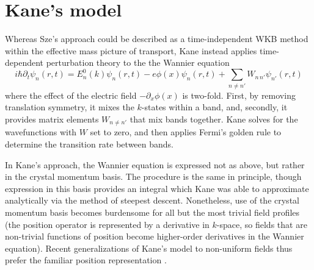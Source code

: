 \section{Kane's model}
Whereas Sze's approach could be described as a time-independent WKB method within the effective mass picture of transport, Kane instead applies time-dependent perturbation theory to the the Wannier equation
$$i\hbar\partial_t\psi_n(r,t)=E_n^0(k)\psi_n(r,t)-e\phi(x)\psi_n(r,t)+\sum_{n\neq n'} W_{n\,n'}\psi_{n'}(r,t)$$
where the effect of the electric field $-\partial_x\phi(x)$ is two-fold.  First, by removing translation symmetry, it mixes the $k$-states within a band, and, secondly, it provides matrix elements $W_{n\neq n'}$ that mix bands together.  Kane solves for the wavefunctions with $W$ set to zero, and then applies Fermi's golden rule to determine the transition rate between bands.

In Kane's approach, the Wannier equation is expressed not as above, but rather in the crystal momentum basis.  The procedure is the same in principle, though expression in this basis provides an integral which Kane was able to approximate analytically via the method of steepest descent.  Nonetheless, use of the crystal momentum basis becomes burdensome for all but the most trivial field profiles (the position operator is represented by a derivative in $k$-space, so fields that are non-trivial functions of position become higher-order derivatives in the Wannier equation).  Recent generalizations of Kane's model to non-uniform fields thus prefer the familiar position representation \cite{Tanaka_1993}.